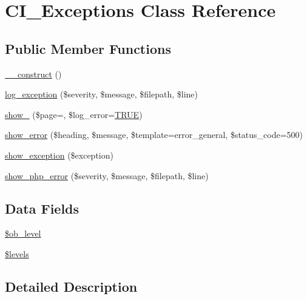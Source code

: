 \hypertarget{class_c_i___exceptions}{}\section{C\+I\+\_\+\+Exceptions Class Reference}
\label{class_c_i___exceptions}
\subsection*{Public Member Functions}
\begin{DoxyCompactItemize}
\item 
\mbox{\hyperlink{class_c_i___exceptions_a095c5d389db211932136b53f25f39685}{\+\_\+\+\_\+construct}} ()
\item 
\mbox{\hyperlink{class_c_i___exceptions_a477bd3360509887aeb6e0a56bcdcad2a}{log\+\_\+exception}} (\$severity, \$message, \$filepath, \$line)
\item 
\mbox{\hyperlink{class_c_i___exceptions_aaee13338b10f986f23d77eabcaf40fec}{show\+\_}} (\$page=\textquotesingle{}\textquotesingle{}, \$log\+\_\+error=\mbox{\hyperlink{constants_8php_ae04a3efe6aa42044f803ee90c2277846}{T\+R\+UE}})
\item 
\mbox{\hyperlink{class_c_i___exceptions_a4214456af4ed4c4d7a292939dea95257}{show\+\_\+error}} (\$heading, \$message, \$template=\textquotesingle{}error\+\_\+general\textquotesingle{}, \$status\+\_\+code=500)
\item 
\mbox{\hyperlink{class_c_i___exceptions_a6ad5ac9b245835caf69b6d3de1f48a85}{show\+\_\+exception}} (\$exception)
\item 
\mbox{\hyperlink{class_c_i___exceptions_a7962c30cacf1341dac1c44d8ab57cebe}{show\+\_\+php\+\_\+error}} (\$severity, \$message, \$filepath, \$line)
\end{DoxyCompactItemize}
\subsection*{Data Fields}
\begin{DoxyCompactItemize}
\item 
\mbox{\hyperlink{class_c_i___exceptions_abb6b6587dbaf0238bf26829c8df05d59}{\$ob\+\_\+level}}
\item 
\mbox{\hyperlink{class_c_i___exceptions_a1035dc0448354cc79f8f9e1ca8dfd0cb}{\$levels}}
\end{DoxyCompactItemize}


\subsection{Detailed Description}


